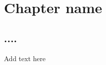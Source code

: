 \clearpage
\thispagestyle{empty}
~\clearpage
\chapter{Chapter name}
\label{chap7}
\section{....}
Add text here

\clearpage 
